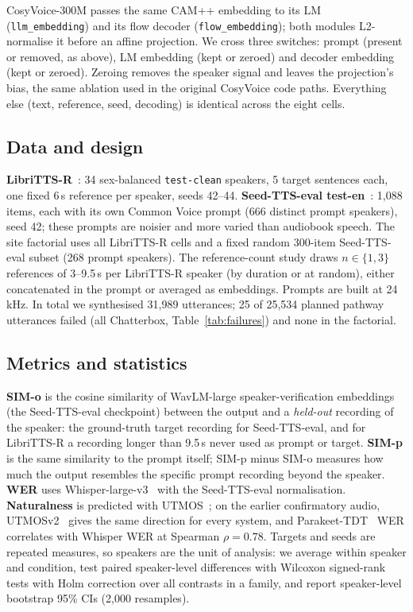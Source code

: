 \documentclass[10pt]{article}
\begin{document}
CosyVoice-300M passes the same CAM++ embedding to its LM (\texttt{llm\_embedding}) and its flow decoder (\texttt{flow\_embedding}); both modules L2-normalise it before an affine projection.
We cross three switches: prompt (present or removed, as above), LM embedding (kept or zeroed) and decoder embedding (kept or zeroed).
Zeroing removes the speaker signal and leaves the projection's bias, the same ablation used in the original CosyVoice code paths.
Everything else (text, reference, seed, decoding) is identical across the eight cells.

\subsection{Data and design}

\textbf{LibriTTS-R}~\citep{libritts_r,libritts}: 34 sex-balanced \texttt{test-clean} speakers, 5 target sentences each, one fixed 6\,s reference per speaker, seeds 42--44.
\textbf{Seed-TTS-eval test-en}~\citep{seedtts}: 1{,}088 items, each with its own Common Voice prompt (666 distinct prompt speakers), seed 42; these prompts are noisier and more varied than audiobook speech.
The site factorial uses all LibriTTS-R cells and a fixed random 300-item Seed-TTS-eval subset (268 prompt speakers).
The reference-count study draws $n \in \{1,3\}$ references of 3--9.5\,s per LibriTTS-R speaker (by duration or at random), either concatenated in the prompt or averaged as embeddings.
Prompts are built at 24\,kHz.
In total we synthesised 31{,}989 utterances; 25 of 25{,}534 planned pathway utterances failed (all Chatterbox, Table~\ref{tab:failures}) and none in the factorial.

\subsection{Metrics and statistics}

\textbf{SIM-o} is the cosine similarity of WavLM-large speaker-verification embeddings (the Seed-TTS-eval checkpoint) between the output and a \emph{held-out} recording of the speaker: the ground-truth target recording for Seed-TTS-eval, and for LibriTTS-R a recording longer than 9.5\,s never used as prompt or target.
\textbf{SIM-p} is the same similarity to the prompt itself; SIM-p minus SIM-o measures how much the output resembles the specific prompt recording beyond the speaker.
\textbf{WER} uses Whisper-large-v3~\citep{whisper} with the Seed-TTS-eval normalisation.
\textbf{Naturalness} is predicted with UTMOS~\citep{utmos}; on the earlier confirmatory audio, UTMOSv2~\citep{utmosv2} gives the same direction for every system, and Parakeet-TDT~\citep{parakeet} WER correlates with Whisper WER at Spearman $\rho{=}0.78$.
Targets and seeds are repeated measures, so speakers are the unit of analysis: we average within speaker and condition, test paired speaker-level differences with Wilcoxon signed-rank tests with Holm correction over all contrasts in a family, and report speaker-level bootstrap 95\% CIs (2{,}000 resamples).
\end{document}
